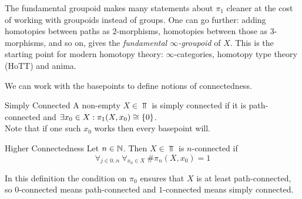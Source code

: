\label{fig:fgpd}

The fundamental groupoid makes many statements about $\pi_1$ cleaner at the cost of working with groupoids instead of groups. One can go further: adding homotopies between paths as $2$-morphisms, homotopies between those as $3$-morphisms, and so on, gives the \emph{fundamental $\infty$-groupoid} of $X$. This is the starting point for modern homotopy theory: $\infty$-categories, homotopy type theory (HoTT) and anima.

\bigskip
We can work with the basepoints to define notions of connectedness.

\begin{definition}{Simply Connected}{}
  A non-empty $X\in\Top$ is simply connected if it is path-connected and $\exists x_0\in X:\pi_1(X,x_0)\cong\{0\}$.\\
  Note that if one such $x_0$ works then every basepoint will.
\end{definition}

\begin{definition}{Higher Connectedness}{}
  Let $n\in\mathbb{N}$. Then $X\in\Top$ is $n$-connected if \[
    \forall_{j\in0..n} \ \forall_{x_0\in X} \ \#\pi_n(X,x_0)=1
  \]
\end{definition}

In this definition the condition on $\pi_0$ ensures that $X$ is at least path-connected, so $0$-connected means path-connected and $1$-connected means simply connected.

\newpage